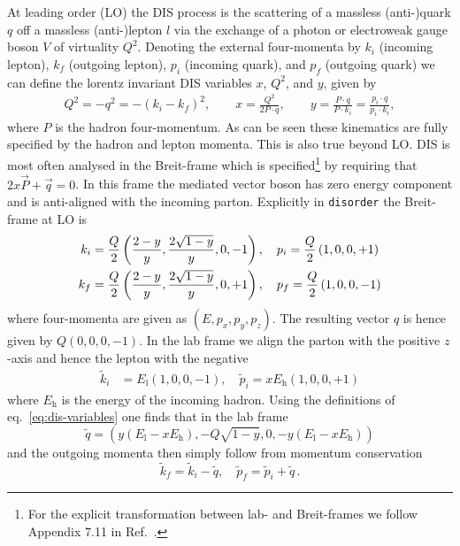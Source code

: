 \documentclass[submission, PhysCodeb]{SciPost}
\newcommand{\disorder}{{\tt disorder}}
\begin{document}
At leading order (LO) the DIS process is
the scattering of a massless (anti-)quark $q$ off a massless
\mbox{(anti-)lepton} $l$ via the exchange of a photon or electroweak
gauge boson $V$ of virtuality $Q^2$. Denoting the external
four-momenta by $k_i$ (incoming lepton), $k_f$ (outgoing lepton),
$p_i$ (incoming quark), and $p_f$ (outgoing quark) we can define the
lorentz invariant DIS variables $x$, $Q^2$, and $y$, given by
\begin{align}
  Q^2 = -q^2 = -(k_i - k_f)^2, \qquad  x = \frac{Q^2}{2 P \cdot q},
  \qquad  y = \frac{P \cdot q}{P \cdot k_i} = \frac{p_i \cdot q}{p_i \cdot k_i} ,
  \label{eq:dis-variables}
\end{align}
where $P$ is the hadron four-momentum. As can be seen these kinematics
are fully specified by the hadron and lepton momenta. This is also
true beyond LO. DIS is most often analysed in the Breit-frame
which is specified\footnote{For the explicit transformation between
lab- and Breit-frames we follow Appendix 7.11 in
Ref.~\cite{Devenish:2004pb}.}  by requiring that $2 x \vec{P} +
\vec{q} = 0$. In this frame the mediated vector boson has zero energy
component and is anti-aligned with the incoming parton. Explicitly in
\disorder{} the Breit-frame at LO is
\begin{align}
  \label{eq:BreitLO}
k_i &= \frac{Q}{2}\left(\frac{2-y}{y},\frac{2\sqrt{1-y}}{y},0,-1 \right), \quad  p_i = \frac{Q}{2}\left(1,0,0,+1 \right) \\ \notag
k_f &= \frac{Q}{2}\left(\frac{2-y}{y},\frac{2\sqrt{1-y}}{y},0,+1 \right), \quad  p_f = \frac{Q}{2}\left(1,0,0,-1 \right) 
\end{align}
where four-momenta are given as $(E,p_x,p_y,p_z)$. The resulting
vector $q$ is hence given by $Q(0,0,0,-1)$. In the lab frame we align
the parton with the positive $z$-axis and hence the lepton with the
negative
\begin{align}
\tilde{k}_i &= E_\mathrm{l}\left(1,0,0,-1 \right), \quad  \tilde{p}_i = x E_\mathrm{h}\left(1,0,0,+1 \right) 
\end{align}
where $E_\mathrm{h}$ is the energy of the incoming hadron. Using the
definitions of eq.~\eqref{eq:dis-variables} one finds that in the lab
frame
\begin{equation}
  \tilde{q} = \left(y(E_\mathrm{l} - x E_\mathrm{h}), -Q\sqrt{1-y},0, -y(E_\mathrm{l} - x E_\mathrm{h})\right) 
\end{equation}
and the outgoing momenta then simply follow from momentum conservation
\begin{equation}
  \label{eq:LabLO}
  \tilde{k}_f = \tilde{k}_i - \tilde{q}, \quad   \tilde{p}_f = \tilde{p}_i + \tilde{q}\,. 
\end{equation}
\end{document}
